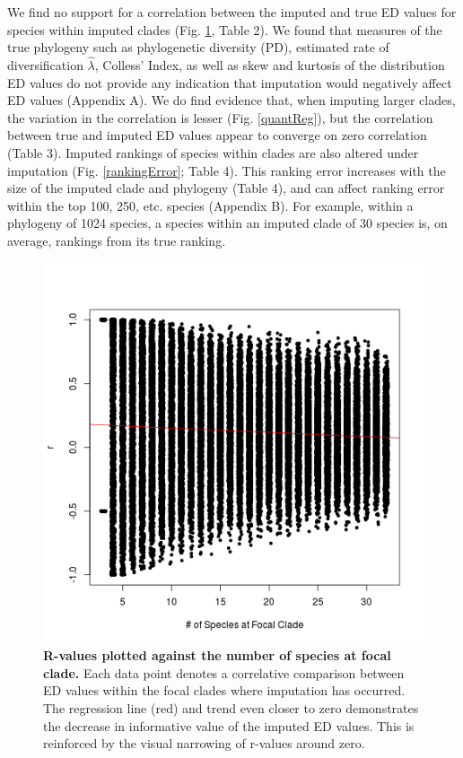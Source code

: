 \documentclass[12pt,english]{article}
\begin{document}
We find no support for a correlation between the imputed and true ED values for
species within imputed clades (Fig. \ref{imputationTrend}, Table 2). We found
that measures of the true phylogeny such as phylogenetic diversity (PD),
estimated rate of diversification $\hat{\lambda}$, Colless' Index, as well as
skew and kurtosis of the distribution ED values do not provide any indication
that imputation would negatively affect ED values (Appendix A). We do find
evidence that, when imputing larger clades, the variation in the correlation is
lesser (Fig. \ref{quantReg}), but the correlation between true and imputed ED
values appear to converge on zero correlation (Table 3). Imputed rankings of
species within clades are also altered under imputation (Fig.
\ref{rankingError}; Table 4). This ranking error increases with the size of the
imputed clade and phylogeny (Table 4), and can affect ranking error within the
top 100, 250, etc. species (Appendix B). For example, within a phylogeny of 1024
species, a species within an imputed clade of 30 species is, on average, 
rankings from its true ranking.

\begin{figure}[!ht]
  \center
  \includegraphics[width=.5\textwidth]{edModel.png}
  \caption{\textbf{R-values plotted against the number of species at focal
  clade.} Each data point denotes a correlative comparison between ED values
  within the focal clades where imputation has occurred. The regression line
  (red) and trend even closer to zero demonstrates the decrease in informative
  value of the imputed ED values. This is reinforced by the visual narrowing of
  r-values around zero.}
  \label{imputationTrend}
\end{figure}
\end{document}
